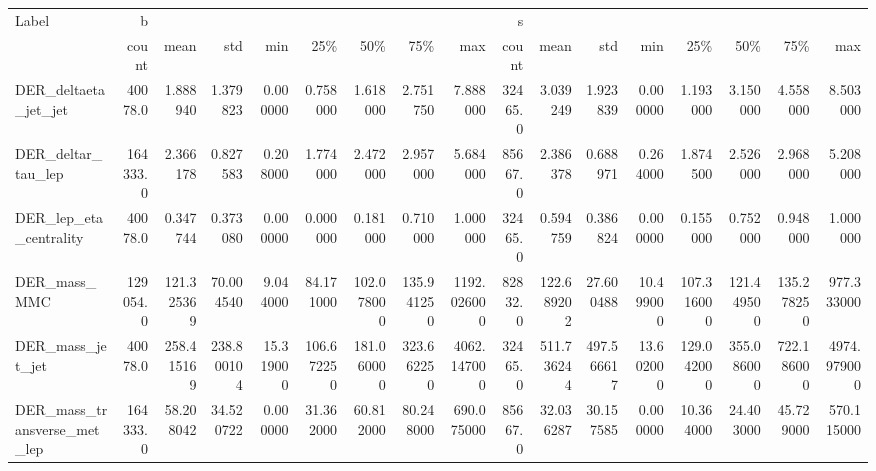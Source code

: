 \begin{tabular}{lrrrrrrrrrrrrrrrr}
\toprule
Label &         b &                &               &                &                &                &                &                &        s &                &               &                &                &                &                &                \\
{} &     count &           mean &           std &            min &            25\% &            50\% &            75\% &            max &    count &           mean &           std &            min &            25\% &            50\% &            75\% &            max \\
\midrule
DER\_deltaeta\_jet\_jet        &   40078.0 &       1.888940 &      1.379823 &       0.000000 &       0.758000 &       1.618000 &       2.751750 &       7.888000 &  32465.0 &       3.039249 &      1.923839 &       0.000000 &       1.193000 &       3.150000 &       4.558000 &       8.503000 \\
DER\_deltar\_tau\_lep          &  164333.0 &       2.366178 &      0.827583 &       0.208000 &       1.774000 &       2.472000 &       2.957000 &       5.684000 &  85667.0 &       2.386378 &      0.688971 &       0.264000 &       1.874500 &       2.526000 &       2.968000 &       5.208000 \\
DER\_lep\_eta\_centrality      &   40078.0 &       0.347744 &      0.373080 &       0.000000 &       0.000000 &       0.181000 &       0.710000 &       1.000000 &  32465.0 &       0.594759 &      0.386824 &       0.000000 &       0.155000 &       0.752000 &       0.948000 &       1.000000 \\
DER\_mass\_MMC                &  129054.0 &     121.325369 &     70.004540 &       9.044000 &      84.171000 &     102.078000 &     135.941250 &    1192.026000 &  82832.0 &     122.689202 &     27.600488 &      10.499000 &     107.316000 &     121.449500 &     135.278250 &     977.333000 \\
DER\_mass\_jet\_jet            &   40078.0 &     258.415169 &    238.800104 &      15.319000 &     106.672250 &     181.060000 &     323.662250 &    4062.147000 &  32465.0 &     511.736244 &    497.566617 &      13.602000 &     129.042000 &     355.086000 &     722.186000 &    4974.979000 \\
DER\_mass\_transverse\_met\_lep &  164333.0 &      58.208042 &     34.520722 &       0.000000 &      31.362000 &      60.812000 &      80.248000 &     690.075000 &  85667.0 &      32.036287 &     30.157585 &       0.000000 &      10.364000 &      24.403000 &      45.729000 &     570.115000 \\

\end{tabular}
